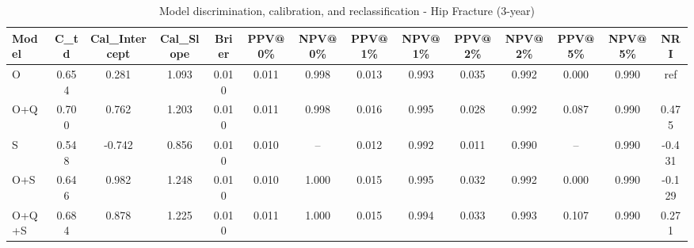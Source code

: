 \begin{table}[htbp]
\centering
\small
\caption{Model discrimination, calibration, and reclassification - Hip Fracture (3-year)}
\label{tab:perf_pd_3y}
\begin{tabular}{lccccccccccccc}
\toprule
Model & C\_td & Cal\_Intercept & Cal\_Slope & Brier & PPV@0\% & NPV@0\% & PPV@1\% & NPV@1\% & PPV@2\% & NPV@2\% & PPV@5\% & NPV@5\% & NRI \\
\midrule
O & 0.654 & 0.281 & 1.093 & 0.010 & 0.011 & 0.998 & 0.013 & 0.993 & 0.035 & 0.992 & 0.000 & 0.990 & ref \\
O+Q & 0.700 & 0.762 & 1.203 & 0.010 & 0.011 & 0.998 & 0.016 & 0.995 & 0.028 & 0.992 & 0.087 & 0.990 & 0.475 \\
S & 0.548 & -0.742 & 0.856 & 0.010 & 0.010 & -- & 0.012 & 0.992 & 0.011 & 0.990 & -- & 0.990 & -0.431 \\
O+S & 0.646 & 0.982 & 1.248 & 0.010 & 0.010 & 1.000 & 0.015 & 0.995 & 0.032 & 0.992 & 0.000 & 0.990 & -0.129 \\
O+Q+S & 0.684 & 0.878 & 1.225 & 0.010 & 0.011 & 1.000 & 0.015 & 0.994 & 0.033 & 0.993 & 0.107 & 0.990 & 0.271 \\
\bottomrule
\end{tabular}
\end{table}